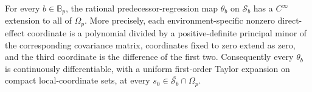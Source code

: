 For every \(b\in\mathbb B_p\), the rational predecessor-regression map \(\theta_b\) on \(\mathcal S_b\) has a \(C^\infty\) extension to all of \(\Omega_p\).  More precisely, each environment-specific nonzero direct-effect coordinate is a polynomial divided by a positive-definite principal minor of the corresponding covariance matrix, coordinates fixed to zero extend as zero, and the third coordinate is the difference of the first two.  Consequently every \(\theta_b\) is continuously differentiable, with a uniform first-order Taylor expansion on compact local-coordinate sets, at every \(s_0\in\overline{\mathcal S_b}\cap\Omega_p\).